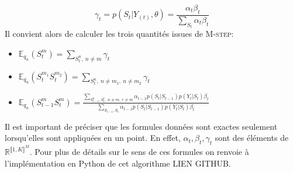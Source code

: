 \documentclass[10pt,a4paper]{article}
\newcommand{\Mstep}{\textsc{M-step}}
\begin{document}
\begin{equation}
\gamma_t=p(S_t \vert Y_{(t)}, \theta)= \frac{\alpha_t \beta_t}{\underset{S_t}{\sum} \alpha_t \beta_t}
\end{equation}
Il convient alors de calculer les trois quantités issues de \Mstep :
\begin{itemize}
\item $\mathbb{E}_{q_n}(S_t^m)= \underset{S_t^n, \ n \neq m}{\sum} \gamma_t$
\item $\mathbb{E}_{q_n}(S_t^{m_1}S_t^{m_2})= \underset{S_t^n, \ n \neq m_1, \ n \neq m_2}{\sum} \gamma_t$
\item $\mathbb{E}_{q_n}(S_{t-1}^mS_t^m)= \frac{\underset{S_{t-1}^n,S_t^r, \ n \neq m, \ r \neq m}{\sum}\alpha_{t-1} p(S_t \vert S_{t-1}) p(Y_t \vert S_t) \beta_t}{\underset{S_{t-1}, S_t}{\sum}\alpha_{t-1}p(S_t \vert S_{t-1})p(Y_t \vert S_t) \beta_t} $
\end{itemize}
Il est important de préciser que les formules données sont exactes seulement lorsqu'elles sont appliquées en un point. En effet, $\alpha_t, \beta_t, \gamma_t$ sont des éléments de $\mathbb{R}^{\llbracket 1,K \rrbracket^M}$. Pour plus de détails sur le sens de ces formules on renvoie à l'implémentation en Python de cet algorithme LIEN GITHUB.
\end{document}
